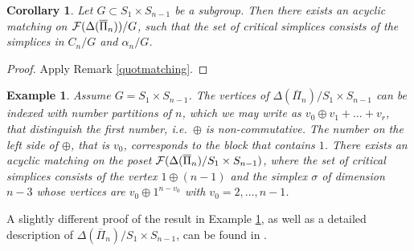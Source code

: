 \documentclass{elsarticle}
\newtheorem{cor}[df]{Corollary}
\newtheorem{ex}[df]{Example}
\begin{document}
\begin{cor}
\label{moeglichkeit1}
Let $G\subset S_1\times S_{n-1}$ be a subgroup. Then there exists an acyclic matching on ${\cal F}(\Delta(\overline{\Pi}_n))/G$, such that the set of critical simplices consists of the simplices in $C_n/G$ and $\alpha_n/G$.
\end{cor}
\begin{proof}
Apply Remark \ref{quotmatching}.
\end{proof}
\begin{ex}
\label{nicematchingex}
Assume $G=S_1\times S_{n-1}$. The vertices of $\Delta(\overline{\Pi}_n)/S_1\times S_{n-1}$ can be indexed with number partitions of $n$, which we may write as $v_0\oplus v_1+\dots+v_r$, that distinguish the first number, i.e.\ $\oplus$ is non-commutative. The number on the left side of $\oplus$, that is $v_0$, corresponds to the block that contains $1$. There exists an acyclic matching on the poset ${\cal F}(\Delta(\overline{\Pi}_n)/S_1\times S_{n-1})$, where the set of critical simplices consists of the vertex $1\oplus(n-1)$ and the simplex $\sigma$ of dimension $n-3$ whose vertices are $v_0\oplus 1^{n-v_0}$ with $v_0=2,\dots,n-1$.
\end{ex}
A slightly different proof of the result in Example \ref{nicematchingex}, as well as a detailed description of $\Delta(\overline{\Pi}_n)/S_1\times S_{n-1}$, can be found in \cite{donau2}.
\end{document}

